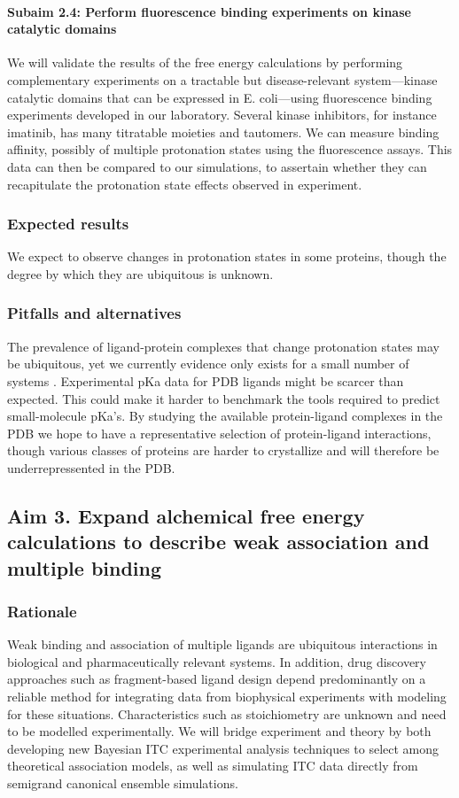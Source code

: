 \documentclass[10pt]{article}
\newcommand{\subsubsubsection}[1]{\paragraph*{#1}}
\begin{document}
\subsubsubsection{Subaim 2.4: Perform fluorescence binding experiments on kinase catalytic domains}
We will validate the results of the free energy calculations by performing complementary experiments on a tractable but disease-relevant system---kinase catalytic domains that can be expressed in E. coli---using fluorescence binding experiments developed in our laboratory. Several kinase inhibitors, for instance imatinib, has many titratable moieties and tautomers. We can measure binding affinity, possibly of multiple protonation states using the fluorescence assays. This data can then be compared to our simulations, to assertain whether they can recapitulate the protonation state effects observed in experiment.
\subsubsection*{Expected results}
We expect to observe changes in protonation states in some proteins, though the degree by which they are ubiquitous is unknown. 
\subsubsection*{Pitfalls and alternatives}
The prevalence of ligand-protein complexes that change protonation states may be ubiquitous, yet we currently evidence only exists for a small number of systems \cite{Aleksandrov2007a,Czodrowski2007a}.
Experimental pKa data for PDB ligands might be scarcer than expected. This could make it harder to benchmark the tools required to predict small-molecule pKa's.
By studying the available protein-ligand complexes in the PDB we hope to have a representative selection of protein-ligand interactions, though various classes of proteins are harder to crystallize and will therefore be underrepressented in the PDB.

		
\subsection*{Aim 3. Expand alchemical free energy calculations to describe weak association and multiple binding}
\subsubsection*{Rationale}
Weak binding and association of multiple ligands are ubiquitous interactions in biological and pharmaceutically relevant systems.
In addition, drug discovery approaches such as fragment-based ligand design depend predominantly on a reliable method for integrating data from biophysical experiments with modeling for these situations. Characteristics such as stoichiometry are unknown and need to be modelled experimentally.
We will bridge experiment and theory by both developing new Bayesian ITC experimental analysis techniques to select among theoretical association models, as well as simulating ITC data directly from semigrand canonical ensemble simulations.
\end{document}
